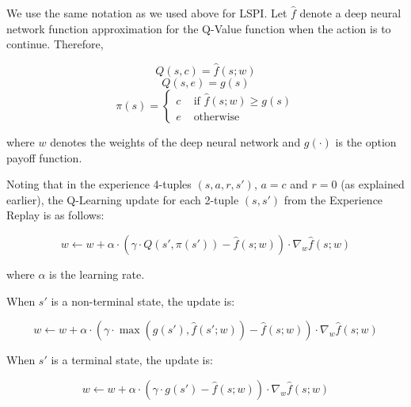 \documentclass[12pt]{amsart}
\begin{document}
We use the same notation as we used above for LSPI. Let $\hat{f}$ denote a deep neural network function approximation for the Q-Value function when the action is to continue. Therefore,

$$Q(s,c) = \hat{f}(s;w)$$
$$Q(s,e) = g(s)$$
$$
\pi(s) =
\begin{cases}
c & \text{ if } \hat{f}(s;w) \geq g(s) \\
e & \text{ otherwise}
\end{cases}
$$

where $w$ denotes the weights of the deep neural network and $g(\cdot)$ is the option payoff function.

Noting that in the experience 4-tuples $(s,a,r,s')$, $a=c$ and $r=0$ (as explained earlier), the Q-Learning update for each 2-tuple $(s,s')$ from the Experience Replay is as follows:

$$w \leftarrow w + \alpha \cdot (\gamma \cdot Q(s', \pi(s')) - \hat{f}(s;w)) \cdot \nabla_w \hat{f}(s;w)$$

where $\alpha$ is the learning rate.

When $s'$ is a non-terminal state, the update is:

$$w \leftarrow w + \alpha \cdot (\gamma \cdot \max(g(s'), \hat{f}(s';w)) - \hat{f}(s;w)) \cdot \nabla_w \hat{f}(s;w)$$

When $s'$ is a terminal state, the update is:

$$w \leftarrow w + \alpha \cdot (\gamma \cdot g(s') - \hat{f}(s;w)) \cdot \nabla_w \hat{f}(s;w)$$
 
\end{document}
